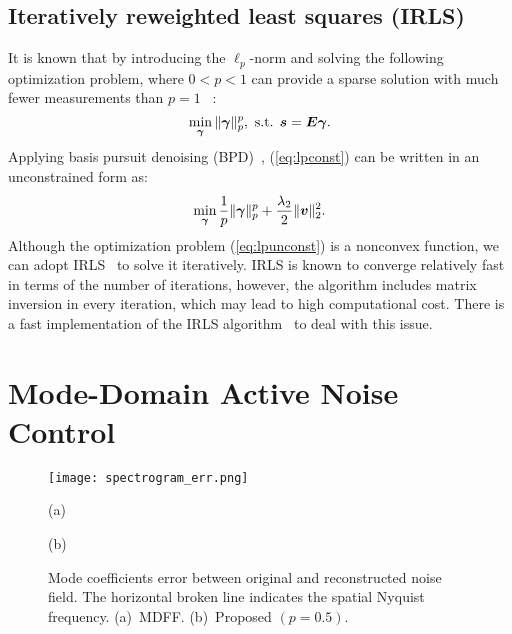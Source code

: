 \documentclass{article}
\newcommand{\mymin}{\mathop{\rm min}\limits}
\begin{document}
\subsection{Iteratively reweighted least squares (IRLS)}

It is known that by introducing the $\ell_p$-norm and solving
the following optimization problem, where $0<p<1$
can provide a sparse solution with much fewer measurements than $p=1$
~\cite{chartrand2007exact,chartrand2008iteratively}:
%
\begin{equation}
\mymin_{\bm{\gamma}} \| \bm{\gamma} \|_p^p, \mbox{ s.t. } \bm{s} = \bm{E} \bm{\gamma} .
\label{eq:lpconst}
\end{equation}
%
Applying basis pursuit denoising (BPD)~\cite{carrillo2009iteratively}, (\ref{eq:lpconst}) can be written in
an unconstrained form as:
%
\begin{equation}
\mymin_{\bm{\gamma}} \frac{1}{p} \| \bm{\gamma} \|^p_p + \frac{\lambda_2}{2} \| \bm{v} \|^2_2 .
\label{eq:lpunconst}
\end{equation}
%
Although the optimization problem (\ref{eq:lpunconst}) is a nonconvex function,
we can adopt IRLS~\cite{chartrand2008iteratively,carrillo2009iteratively}
to solve it iteratively.
IRLS is known to converge relatively fast in terms of the number of iterations,
however, the algorithm includes matrix inversion in every iteration,
which may lead to high computational cost.
There is a fast implementation of the IRLS algorithm~\cite{chen2014fast}
to deal with this issue.


%
\section{Mode-Domain Active Noise Control}
\label{sec:ANC}

%
\begin{figure}[t]
\vspace*{-10pt}
  \centering
  \centerline{\texttt{[image: spectrogram\_err.png]}}
\begin{minipage}{0.49\linewidth}
\centering
(a)
\end{minipage}
\begin{minipage}{0.49\linewidth}
\centering
\hspace{-11mm}
(b)
\end{minipage}
\vspace{-1pt}
\caption{Mode coefficients error between original and reconstructed noise field. The horizontal broken line indicates the spatial Nyquist frequency. (a)~MDFF. (b)~Proposed $(p=0.5)$.}
\label{fig:spec_err}
\vspace{-4pt}
\end{figure}
%
\end{document}
